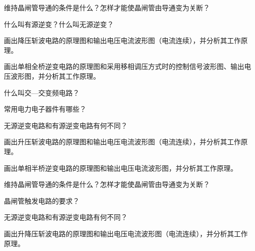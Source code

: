 \documentclass[电力电子]{subfiles}
\begin{document}
\begin{ti}[5 分]
	维持晶闸管导通的条件是什么？怎样才能使晶闸管由导通变为关断？
\end{ti}

\begin{ti}[5 分]
	什么叫有源逆变？什么叫无源逆变？
\end{ti}

\begin{ti}[12 分]
	画出降压斩波电路的原理图和输出电压电流波形图（电流连续），并分析其工作原理。
\end{ti}

\begin{ti}[12 分]
	画出单相全桥逆变电路的原理图和采用移相调压方式时的控制信号波形图、输出电压波形图，并分析其工作原理。
\end{ti}

\begin{ti}[4 分]
	什么叫交—交变频电路？
\end{ti}

\begin{ti}[4 分]
	常用电力电子器件有哪些？
\end{ti}

\begin{ti}[4 分]
	无源逆变电路和有源逆变电路有何不同？
\end{ti}

\begin{ti}[15 分]
	画出升压斩波电路的原理图和输出电压电流波形图（电流连续），并分析其工作原理。
\end{ti}

\begin{ti}[15 分]
	画出单相半桥逆变电路的原理图和输出电压电流波形图，并分析其工作原理。
\end{ti}

\begin{ti}[4 分]
	维持晶闸管导通的条件是什么？怎样才能使晶闸管由导通变为关断？
\end{ti}

\begin{ti}[4 分]
	晶闸管触发电路的要求？
\end{ti}

\begin{ti}[4 分]
	无源逆变电路和有源逆变电路有何不同？
\end{ti}

\begin{ti}[15 分]
	画出升降压斩波电路的原理图和输出电压电流波形图（电流连续），并分析其工作原理。
\end{ti}
\end{document}
